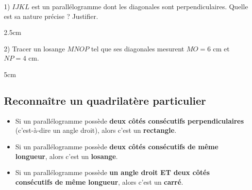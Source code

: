 \documentclass[a4paper]{book}
\begin{document}
\begin{propriete}
\begin{center}
            \hfill
            \hspace{2cm}
            \text{ }
        \end{center}
    \end{propriete}

    
    \begin{exercice}
        1) $IJKL$ est un parallélogramme dont les diagonales sont perpendiculaires. Quelle est sa nature précise ? Justifier.
        \begin{ZoneReponse}{2.5cm}
        \end{ZoneReponse}
        
        \vspace{0.2cm}
        2) Tracer un losange $MNOP$ tel que ses diagonales mesurent $MO = 6\text{ cm}$ et $NP = 4\text{ cm}$.
        \begin{ZoneReponse}{5cm}
        \end{ZoneReponse}
    \end{exercice}


\subsection{Reconnaître un quadrilatère particulier}

    \begin{propriete}
    \begin{itemize}
        \item Si un parallélogramme possède \textbf{deux côtés consécutifs perpendiculaires} (c'est-à-dire un angle droit), alors c'est un \textbf{rectangle}.
        \item Si un parallélogramme possède \textbf{deux côtés consécutifs de même longueur}, alors c'est un \textbf{losange}.
        \item Si un parallélogramme possède \textbf{un angle droit ET deux côtés consécutifs de même longueur}, alors c'est un \textbf{carré}.
    \end{itemize}
    \end{propriete}
\end{document}
